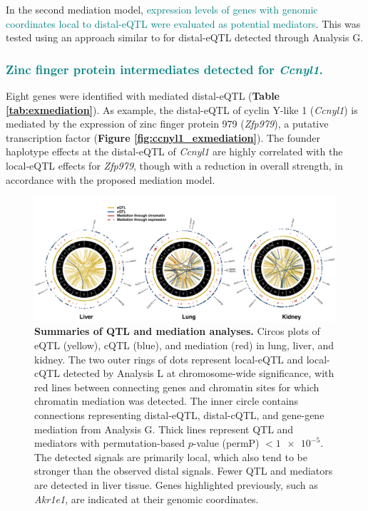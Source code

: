 \documentclass[9pt,twocolumn,twoside]{gsajnl}
\newcommand{\GKinline}[1]{\textcolor{teal}{#1}}
\begin{document}
In the second mediation model, \GKinline{expression levels of genes with genomic coordinates local to distal-eQTL were evaluated as potential mediators}. This was tested using an approach similar to \cite{Keller2018} for distal-eQTL detected through Analysis G. 
\subsubsection{\GKinline{Zinc finger protein intermediates detected for \textit{Ccnyl1}.}}
Eight genes were identified with mediated distal-eQTL (\textbf{Table \ref{tab:exmediation}}). As example, the distal-eQTL of cyclin Y-like 1 (\textit{Ccnyl1}) is mediated by the expression of zinc finger protein 979 (\textit{Zfp979}), a putative transcription factor (\textbf{Figure \ref{fig:ccnyl1_exmediation}}). The founder haplotype effects at the distal-eQTL of \textit{Ccnyl1} are highly correlated with the local-eQTL effects for \textit{Zfp979}, though with a reduction in overall strength, in accordance with the proposed mediation model.

\begin{figure}[h!]
\renewcommand{\familydefault}{\sfdefault}\normalfont
\centering
\includegraphics[width=\textwidth, trim={0in 0in 0in 0in}, clip]{figs/circos_over_tissues.pdf}
\caption{\textbf{Summaries of QTL and mediation analyses.} Circos plots of eQTL (yellow), cQTL (blue), and mediation (red) in lung, liver, and kidney. The two outer rings of dots represent local-eQTL and local-cQTL detected by Analysis L at chromosome-wide significance, with red lines between connecting genes and chromatin sites for which chromatin mediation was detected. The inner circle contains connections representing distal-eQTL, distal-cQTL, and gene-gene mediation from Analysis G. Thick lines represent QTL and mediators with permutation-based $p$-value (permP) $< \num{1e-5}$. The detected signals are primarily local, which also tend to be stronger than the observed distal signals. Fewer QTL and mediators are detected in liver tissue. 
Genes highlighted previously, such as \textit{Akr1e1}, are indicated at their genomic coordinates.
\label{fig:circos_plot}}
\end{figure}
\end{document}
